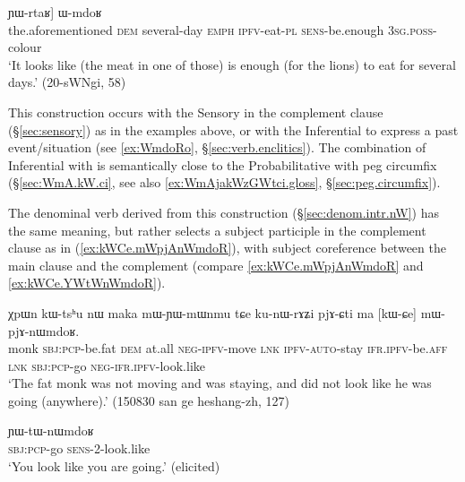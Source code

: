 \begin{exe}
	\ex \label{ex:YWrtaR.WmdoR}
	\gll    [iɕqʰa nɯ [kɤntɕʰɯ-sŋi ʑo tu-ndza-nɯ] ɲɯ-rtaʁ] ɯ-mdoʁ  \\
	the.aforementioned \textsc{dem} several-day \textsc{emph} \textsc{ipfv}-eat-\textsc{pl} \textsc{sens}-be.enough \textsc{3sg}.\textsc{poss}-colour \\
	\glt `It looks like (the meat in one of those) is enough (for the lions) to eat for several days.' (20-sWNgi, 58)
\end{exe}

This construction occurs with the Sensory in the complement clause (§\ref{sec:sensory}) as in the examples above, or with the Inferential to express a past event/situation (see \ref{ex:WmdoRo}, §\ref{sec:verb.enclitics}). The combination of Inferential with  is semantically close to the Probabilitative with peg circumfix (§\ref{sec:WmA.kW.ci}, see also \ref{ex:WmAjakWzGWtci.gloss}, §\ref{sec:peg.circumfix}).

The denominal verb   derived from this construction (§\ref{sec:denom.intr.nW}) has the same meaning, but rather selects a subject participle in the complement clause as in (\ref{ex:kWCe.mWpjAnWmdoR}), with subject coreference between the main clause and the complement (compare \ref{ex:kWCe.mWpjAnWmdoR} and \ref{ex:kWCe.YWtWnWmdoR}).


\begin{exe}
	\ex \label{ex:kWCe.mWpjAnWmdoR}
	\gll  χpɯn kɯ-tsʰu nɯ maka mɯ-ɲɯ-mɯnmu tɕe ku-nɯ-rɤʑi pjɤ-ɕti ma [kɯ-ɕe] mɯ-pjɤ-nɯmdoʁ. \\
	monk \textsc{sbj}:\textsc{pcp}-be.fat \textsc{dem} at.all \textsc{neg}-\textsc{ipfv}-move \textsc{lnk} \textsc{ipfv}-\textsc{auto}-stay \textsc{ifr}.\textsc{ipfv}-be.\textsc{aff} \textsc{lnk} \textsc{sbj}:\textsc{pcp}-go \textsc{neg}-\textsc{ifr}.\textsc{ipfv}-look.like \\
	\glt `The fat monk was not moving and was staying, and did not look like he was going (anywhere).'  (150830 san ge heshang-zh, 127)
\end{exe}

\begin{exe}
	\ex \label{ex:kWCe.YWtWnWmdoR}
	\gll [kɯ-ɕe] ɲɯ-tɯ-nɯmdoʁ \\
	\textsc{sbj}:\textsc{pcp}-go \textsc{sens}-2-look.like \\
	\glt `You look like you are going.' (elicited)
\end{exe}  

